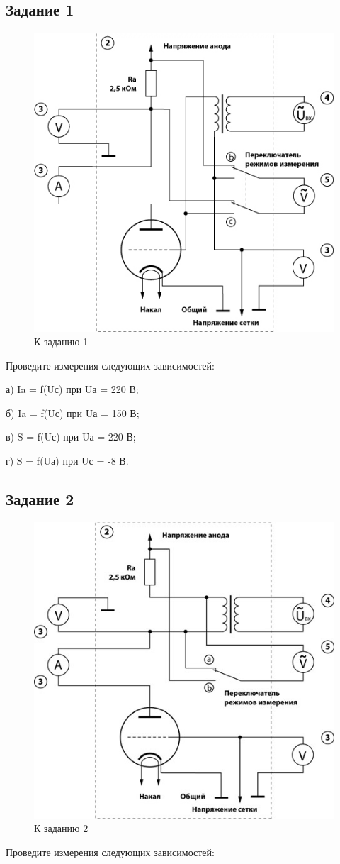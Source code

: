 \subsection{Задание 1}
\begin{figure}[h!]
 	\centering
	\includegraphics[width=0.5\linewidth]{fig/img5.jpg}
 	\caption{К заданию 1}
 	\label{fig:11}
\end{figure}

Проведите измерения следующих зависимостей:

а) Ia = f(Uс) при Uа = 220 В; 

б) Ia = f(Uс) при Uа = 150 В;

в) S = f(Uс) при Uа = 220 В; 

г) S = f(Uа) при Uс = -8 В.

\subsection{Задание 2}
\begin{figure}[h!]
 	\centering
	\includegraphics[width=0.5\linewidth]{fig/img6.jpg}
 	\caption{К заданию 2}
 	\label{fig:11}
\end{figure}

Проведите измерения следующих зависимостей:

